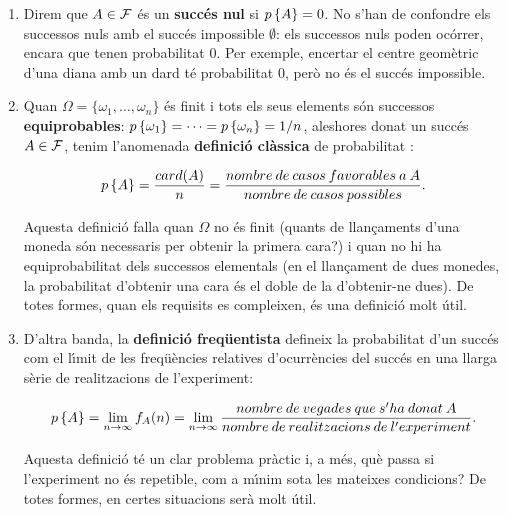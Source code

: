 \begin{enumerate}

\item Direm que $A \in {\cal F}$ \'es un {\bf succ\'es nul}
 si $p\left\{A\right\} = 0$. No s'han de confondre els successos 
nuls amb el succ\'es impossible $\emptyset$: els successos
nuls poden oc\'orrer, encara que tenen probabilitat 0. Per exemple, encertar el
centre geom\`etric d'una diana amb un dard t\'e probabilitat 0, per\`o no \'es
el succ\'es impossible.

\item Quan $\Omega = \{ \omega_1, \ldots , \omega_n \}$ \'es finit i tots els
seus elements s\'on successos {\bf
equiprobables}: 
$p\left\{\omega_1\right\} = \cdots =p\left\{\omega_n\right\} = 1/n$, aleshores donat un succ\'es $A \in
{\cal F}$, tenim l'anomenada {\bf
definici\'o cl\`assica} de
probabilitat
:

$$p\left\{A\right\} = {card(A) \over n} = {nombre \> de \> casos \> favorables \> a \> A
\over nombre \> de \> casos \> possibles}.$$

Aquesta definici\'o falla quan $\Omega$ no \'es finit (quants de
llan\c{c}aments d'una moneda s\'on necessaris per obtenir la primera cara?)
i quan no hi ha equiprobabilitat dels successos elementals (en el
llan\c{c}ament de dues monedes, la probabilitat d'obtenir una cara \'es el doble
de la d'obtenir-ne dues). De totes formes, quan els requisits es compleixen,
\'es una definici\'o molt \'util.

\item D'altra banda, la {\bf definici\'o freq\"uentista}
defineix la probabilitat d'un succ\'es com el l\'{\i}mit de les freq\"u\`encies
relatives d'ocurr\`encies
del succ\'es en una llarga s\`erie de realitzacions de l'experiment:

$$p\left\{A\right\} = \lim_{n \to \infty} f_A(n) = \lim_{n \to \infty} {nombre \> de \>
vegades \> que \> s'ha \> donat \> A \over nombre \> de \> realitzacions \> de
\> l'experiment}.$$

Aquesta definici\'o t\'e un clar problema pr\`actic i, a m\'es, qu\`e passa si
l'ex\-pe\-ri\-ment no \'es repetible, com a m\'{\i}nim sota les mateixes condicions? De
totes formes, en certes situacions ser\`a molt \'util.

\end{enumerate}

